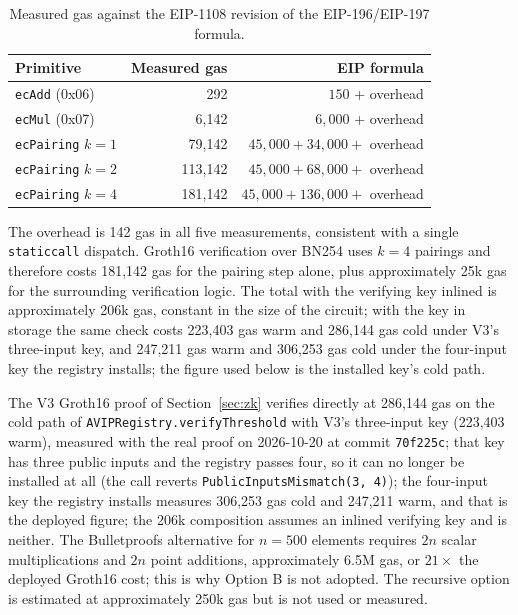 \documentclass[11pt,a4paper]{article}
\numberwithin{equation}{section}
\numberwithin{table}{section}
\begin{document}
\begin{table}[H]
\centering
\caption{Measured gas against the EIP-1108 revision of the EIP-196/EIP-197 formula.}
\label{tab:gas-eip}
\small
\begin{tabular}{lrr}
\toprule
Primitive & Measured gas & EIP formula \\
\midrule
\texttt{ecAdd} (0x06) & 292 & $150$ + overhead \\
\texttt{ecMul} (0x07) & 6{,}142 & $6{,}000$ + overhead \\
\texttt{ecPairing} $k=1$ & 79{,}142 & $45{,}000 + 34{,}000 + $ overhead \\
\texttt{ecPairing} $k=2$ & 113{,}142 & $45{,}000 + 68{,}000 + $ overhead \\
\texttt{ecPairing} $k=4$ & 181{,}142 & $45{,}000 + 136{,}000 + $ overhead \\
\bottomrule
\end{tabular}
\end{table}

The overhead is 142 gas in all five measurements, consistent with a single \texttt{staticcall} dispatch. Groth16 verification over BN254 uses $k = 4$ pairings and therefore costs 181{,}142 gas for the pairing step alone, plus approximately 25k gas for the surrounding verification logic. The total with the verifying key inlined is approximately 206k gas, constant in the size of the circuit; with the key in storage the same check costs 223{,}403 gas warm and 286{,}144 gas cold under V3's three-input key, and 247{,}211 gas warm and 306{,}253 gas cold under the four-input key the registry installs; the figure used below is the installed key's cold path.

The V3 Groth16 proof of Section~\ref{sec:zk} verifies directly at 286{,}144 gas on the cold path of \texttt{AVIPRegistry.verifyThreshold} with V3's three-input key (223{,}403 warm), measured with the real proof on 2026-10-20 at commit \texttt{70f225c}; that key has three public inputs and the registry passes four, so it can no longer be installed at all (the call reverts \texttt{PublicInputsMismatch(3,~4)}); the four-input key the registry installs measures 306{,}253 gas cold and 247{,}211 warm, and that is the deployed figure; the 206k composition assumes an inlined verifying key and is neither. The Bulletproofs alternative for $n = 500$ elements requires $2n$ scalar multiplications and $2n$ point additions, approximately 6.5M gas, or $21\times$ the deployed Groth16 cost; this is why Option B is not adopted. The recursive option is estimated at approximately 250k gas but is not used or measured.
\end{document}
